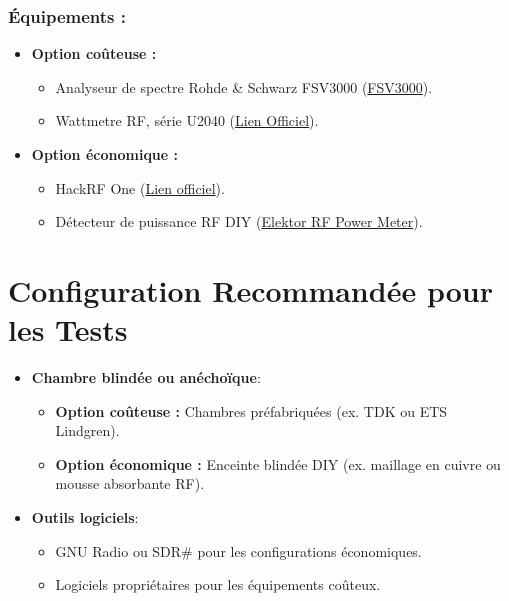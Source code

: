 \documentclass[a4paper,12pt]{article}
\begin{document}
\subsubsection*{Équipements :}
\begin{itemize}
    \item \textbf{Option coûteuse :}
          \begin{itemize}
              \item Analyseur de spectre Rohde \& Schwarz FSV3000 (\href{https://www.rohde-schwarz.com/product/FSV3000.html}{FSV3000}).
              \item Wattmetre RF, série U2040 (\href{https://www.keysight.com/us/en/assets/7018-04521/data-sheets/5992-0040.pdf}{Lien Officiel}).
          \end{itemize}
    \item \textbf{Option économique :}
          \begin{itemize}
              \item HackRF One (\href{https://greatscottgadgets.com/hackrf/one/}{Lien officiel}).
              \item Détecteur de puissance RF DIY (\href{https://www.motorobit.com/usb-rf-power-meter-v30-100k-10ghz-rf-power-meter-with-display}{Elektor RF Power Meter}).
          \end{itemize}
\end{itemize}

\section{Configuration Recommandée pour les Tests}
\begin{itemize}
    \item \textbf{Chambre blindée ou anéchoïque}:
          \begin{itemize}
              \item \textbf{Option coûteuse :} Chambres préfabriquées (ex. TDK ou ETS Lindgren). %
              \item \textbf{Option économique :} Enceinte blindée DIY (ex. maillage en cuivre ou mousse absorbante RF). %
          \end{itemize}
    \item \textbf{Outils logiciels}:
          \begin{itemize}
              \item GNU Radio ou SDR\# pour les configurations économiques.
              \item Logiciels propriétaires pour les équipements coûteux. %
          \end{itemize}
\end{itemize}
\end{document}
